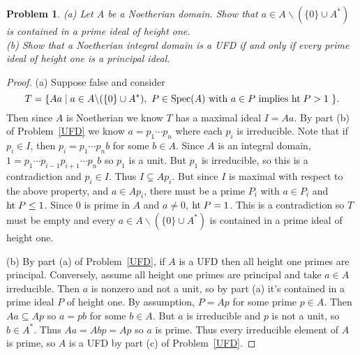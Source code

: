 \documentclass{article}
\newcommand{\spec}{\textup{Spec}}
\newcommand{\Ht}{\textup{ht}\;}
\newtheorem{problem}{Problem}
\begin{document}
\begin{problem}
\label{UFD2}
(a) Let $A$ be a Noetherian domain. Show that $a \in A \backslash (\{0\} \cup A^*)$ is contained in a prime ideal of height one.\\
(b) Show that a Noetherian integral domain is a UFD if and only if every prime ideal of height one is a principal ideal.
\end{problem}
\begin{proof}
(a) Suppose false and consider
\[
T = \{Aa \mid a \in A \backslash (\{0\} \cup A^*), \text{ $P \in \spec(A)$ with $a \in P$ implies $\Ht P > 1$ }\}.
\]
Then since $A$ is Noetherian we know $T$ has a maximal ideal $I = Aa$. By part (b) of Problem~\ref{UFD} we know $a = p_1 \cdots p_n$ where each $p_i$ is irreducible. Note that if $p_i \in I$, then $p_i = p_1 \cdots p_n b$ for some $b \in A$. Since $A$ is an integral domain, $1 = p_1 \cdots p_{i-1}p_{i+1} \cdots p_n b$ so $p_1$ is a unit. But $p_1$ is irreducible, so this is a contradiction and $p_i \in I$. Thus $I \subsetneq Ap_i$. But since $I$ is maximal with respect to the above property, and $a \in Ap_i$, there must be a prime $P_i$ with $a \in P_i$ and $\Ht P \leq 1$. Since $0$ is prime in $A$ and $a \neq 0$, $\Ht P = 1$. This is a contradiction so $T$ must be empty and every $a \in A \backslash (\{0\} \cup A^*)$ is contained in a prime ideal of height one.

(b) By part (a) of Problem~\ref{UFD}, if $A$ is a UFD then all height one primes are principal. Conversely, assume all height one primes are principal and take $a \in A$ irreducible. Then $a$ is nonzero and not a unit, so by part (a) it's contained in a prime ideal $P$ of height one. By assumption, $P = Ap$ for some prime $p \in A$. Then $Aa \subseteq Ap$ so $a = pb$ for some $b \in A$. But $a$ is irreducible and $p$ is not a unit, so $b \in A^*$. Thus $Aa = Abp = Ap$ so $a$ is prime. Thus every irreducible element of $A$ is prime, so $A$ is a UFD by part (c) of Problem~\ref{UFD}.
\end{proof}
\end{document}
